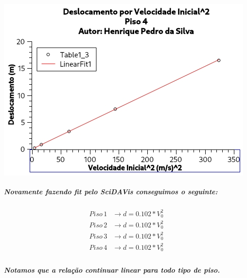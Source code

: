 \documentclass[12pt,twoside, a4paper, twocolumn]{article}
\begin{document}
\begin{adjustbox}{scale=0.75}
    \includegraphics{Grafico-4.jpg}
\end{adjustbox}

\subparagraph*{Novamente fazendo \emph{fit} pelo SciDAVis conseguimos o seguinte:}

\begin{equation}
    \begin{aligned}
        Piso\, 1 & \rightarrow d = 0.102 * V_0^2 \\
        Piso\, 2 & \rightarrow d = 0.102 * V_0^2 \\
        Piso\, 3 & \rightarrow d = 0.102 * V_0^2 \\
        Piso\, 4 & \rightarrow d = 0.102 * V_0^2 \\
    \end{aligned}
\end{equation}

\subparagraph*{Notamos que a relação continuar linear para todo tipo de piso.}


\paragraph*{\\ \\ \\ \\ \\ \\ \\ }
\end{document}
